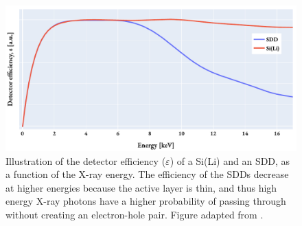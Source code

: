 \begin{figure}[pht]
    \centering
    \includegraphics[width=0.8\linewidth]{figures/detector_efficiency_illustration.pdf}
    \caption{
        Illustration of the detector efficiency ($\varepsilon$) of a Si(Li) and an SDD, as a function of the X-ray energy.
        The efficiency of the SDDs decrease at higher energies because the active layer is thin, and thus high energy X-ray photons have a higher probability of passing through without creating an electron-hole pair.
        Figure adapted from \cite{liao2006practical}. %
    }
    \label{fig:detector_efficiency}
\end{figure}





